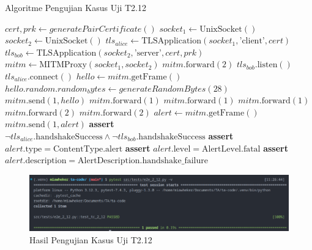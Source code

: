 \begin{algorithm}
  \caption{Algoritme Pengujian Kasus Uji T2.12}
  \label{alg:unit.test.t2.12}
  \begin{algorithmic}
    \State $cert, prk \gets generatePairCertificate()$
    \State $socket_1 \gets \text{UnixSocket}()$
    \State $socket_2 \gets \text{UnixSocket}()$
    \State $tls_{alice} \gets \text{TLSApplication}(socket_1, \text{'client'}, cert)$ 
    \State $tls_{bob} \gets \text{TLSApplication}(socket_2, \text{'server'}, cert, prk)$
    \State $mitm \gets \text{MITMProxy}(socket_1, socket_2)$
    \State
    \State $mitm.\text{forward}(2)$ 
    \State $tls_{bob}.\text{listen}()$  
    \State $tls_{alice}.\text{connect}()$  
    \State
    \State $hello \gets mitm.\text{getFrame}()$ 
    \State $hello.random.random_bytes \gets generateRandomBytes(28)$
    \State $mitm.\text{send}(1, hello)$
    \State $mitm.\text{forward}(1)$ 
    \State $mitm.\text{forward}(1)$ 
    \State $mitm.\text{forward}(1)$ 
    \State $mitm.\text{forward}(2)$ 
    \State $mitm.\text{forward}(2)$ 
    \State
    \State $alert \gets mitm.\text{getFrame}()$
    \State $mitm.\text{send}(1, alert)$
    \State
    \State \textbf{assert} $\lnot tls_{alice}.\text{handshakeSuccess} \land \lnot tls_{bob}.\text{handshakeSuccess}$
    \State \textbf{assert} $alert.\text{type} = \text{ContentType.alert}$
    \State \textbf{assert} $alert.\text{level} = \text{AlertLevel.fatal}$
    \State \textbf{assert} $alert.\text{description} = \text{AlertDescription.handshake\_failure}$
  \end{algorithmic}
\end{algorithm}

\begin{figure}[ht]
  \centering
  \includegraphics[width=\textwidth]{chapters/res/appendix-4/2.12.png}
  \caption{Hasil Pengujian Kasus Uji T2.12}
  \label{fig:unit.test.t2.12}
\end{figure}

